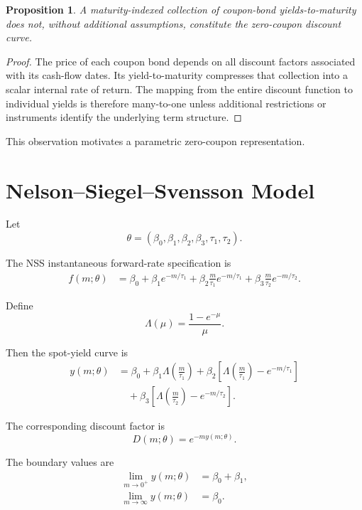 \documentclass[a4paper,10pt]{article}
\newtheorem{proposition}{Proposition}[section]
\theoremstyle{remark}
\begin{document}
\begin{proposition}
A maturity-indexed collection of coupon-bond yields-to-maturity does not, without additional assumptions, constitute the zero-coupon discount curve.
\end{proposition}

\begin{proof}
The price of each coupon bond depends on all discount factors associated with its cash-flow dates. Its yield-to-maturity compresses that collection into a scalar internal rate of return. The mapping from the entire discount function to individual yields is therefore many-to-one unless additional restrictions or instruments identify the underlying term structure.\end{proof}

This observation motivates a parametric zero-coupon representation.

\section{Nelson--Siegel--Svensson Model}

Let
\begin{equation}
\theta=(\beta_0,\beta_1,\beta_2,\beta_3,\tau_1,\tau_2).
\end{equation}

The NSS instantaneous forward-rate specification is
\begin{align}
f(m;\theta)
&=\beta_0+\beta_1e^{-m/\tau_1}
+\beta_2\frac{m}{\tau_1}e^{-m/\tau_1}
+\beta_3\frac{m}{\tau_2}e^{-m/\tau_2}.
\end{align}

Define
\begin{equation}
\Lambda(\mu)=\frac{1-e^{-\mu}}{\mu}.
\end{equation}

Then the spot-yield curve is
\begin{align}
y(m;\theta)
&=\beta_0
+\beta_1\Lambda\left(\frac{m}{\tau_1}\right)
+\beta_2\left[\Lambda\left(\frac{m}{\tau_1}\right)-e^{-m/\tau_1}\right]
\\
&\quad+\beta_3\left[\Lambda\left(\frac{m}{\tau_2}\right)-e^{-m/\tau_2}\right].
\end{align}

The corresponding discount factor is
\begin{equation}
D(m;\theta)=e^{-m y(m;\theta)}.
\end{equation}

The boundary values are
\begin{align}
\lim_{m\to 0^+}y(m;\theta)&=\beta_0+\beta_1,\\
\lim_{m\to\infty}y(m;\theta)&=\beta_0.
\end{align}
\end{document}
